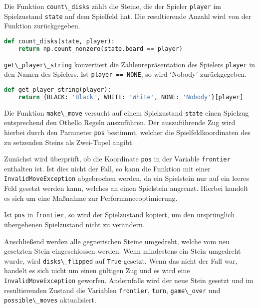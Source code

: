 Die Funktion \passthrough{\lstinline!count\_disks!} zählt die Steine,
die der Spieler \passthrough{\lstinline!player!} im Spielzustand
\passthrough{\lstinline!state!} auf dem Spielfeld hat. Die resultierende
Anzahl wird von der Funktion zurückgegeben.

\begin{lstlisting}[language=Python]
def count_disks(state, player):
    return np.count_nonzero(state.board == player)
\end{lstlisting}

\passthrough{\lstinline!get\_player\_string!} konvertiert die
Zahlenrepräsentation des Spielers \passthrough{\lstinline!player!} in
den Namen des Spielers. Ist \passthrough{\lstinline!player == NONE!}, so
wird `Nobody' zurückgegeben.

\begin{lstlisting}[language=Python]
def get_player_string(player):
    return {BLACK: 'Black', WHITE: 'White', NONE: 'Nobody'}[player]
\end{lstlisting}

Die Funktion \passthrough{\lstinline!make\_move!} versucht auf einem
Spielzustand \passthrough{\lstinline!state!} einen Spielzug entsprechend
den Othello Regeln auszuführen. Der auszuführende Zug wird hierbei durch
den Parameter \passthrough{\lstinline!pos!} bestimmt, welcher die
Spielfeldkoordinaten des zu setzenden Steins als Zwei-Tupel angibt.

Zunächst wird überprüft, ob die Koordinate \passthrough{\lstinline!pos!}
in der Variable \passthrough{\lstinline!frontier!} enthalten ist. Ist
dies nicht der Fall, so kann die Funktion mit einer
\passthrough{\lstinline!InvalidMoveException!} abgebrochen werden, da
ein Spielstein nur auf ein leeres Feld gesetzt werden kann, welches an
einen Spielstein angrenzt. Hierbei handelt es sich um eine Maßnahme zur
Performanceoptimierung.

Ist \passthrough{\lstinline!pos!} in \passthrough{\lstinline!frontier!},
so wird der Spielzustand kopiert, um den ursprünglich übergebenen
Spielzustand nicht zu verändern.

Anschließend werden alle gegnerischen Steine umgedreht, welche vom neu
gesetzten Stein eingeschlossen werden. Wenn mindestens ein Stein
umgedreht wurde, wird \passthrough{\lstinline!disks\_flipped!} auf
\passthrough{\lstinline!True!} gesetzt. Wenn das nicht der Fall war,
handelt es sich nicht um einen gültigen Zug und es wird eine
\passthrough{\lstinline!InvalidMoveException!} geworfen. Andernfalls
wird der neue Stein gesetzt und im resultierenden Zustand die Variablen
\passthrough{\lstinline!frontier!}, \passthrough{\lstinline!turn!},
\passthrough{\lstinline!game\_over!} und
\passthrough{\lstinline!possible\_moves!} aktualisiert.

